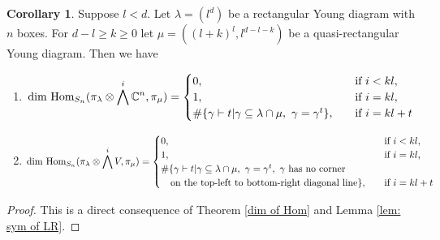 \documentclass[11pt]{amsart}
\numberwithin{equation}{section}
\theoremstyle{definition}
\newtheorem{corollary}[thm]{Corollary}
\begin{document}
\begin{corollary}\label{cor: dim of Hom for l<d case}
     Suppose \(l <d\). Let $\lambda=(l^{d})$ be a rectangular Young diagram with $n$ boxes. For $d-l\geq k\geq0$ let $\mu=((l+k)^{l},l^{d-l-k})$  be a quasi-rectangular Young diagram. Then we have
    \begin{enumerate}
        \item 
        \begin{eqnarray*}
        \textnormal{dim Hom}_{S_{n}}(\pi_{\lambda}\otimes\bigwedge^{i}\mathbb{C}^{n},\pi_{\mu})=\begin{cases}
            0,\quad & \textnormal{if}\ i<kl,\\
            1,\quad& \textnormal{if}\ i=kl,\\
            \#\{\gamma\vdash t|\gamma\subseteq\lambda\cap\mu,\ \gamma=\gamma^{t}\},\quad& \textnormal{if}\ i=kl+t
        \end{cases}
        \end{eqnarray*}
        
        \item 
        \begin{eqnarray*}
        \textnormal{dim Hom}_{S_{n}}(\pi_{\lambda}\otimes\bigwedge^{i}V,\pi_{\mu})=\begin{cases}
            0,\quad & \textnormal{if}\ i<kl,\\
            1,\quad& \textnormal{if}\ i=kl,\\
            \#\{\gamma\vdash t|\gamma\subseteq\lambda\cap\mu,\ \gamma=\gamma^{t},\  \gamma\ \textnormal{has no corner}\\
            \quad\textnormal{on the top-left to bottom-right diagonal line}\},\quad& \textnormal{if}\ i=kl+t
        \end{cases}
        \end{eqnarray*}
    \end{enumerate}
\end{corollary}
\begin{proof}
    This is a direct consequence of Theorem \ref{dim of Hom} and Lemma \ref{lem: sym of LR}.
\end{proof}
\end{document}
